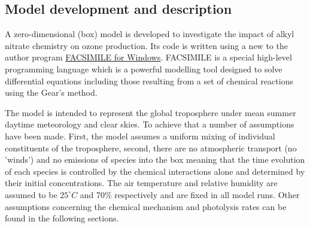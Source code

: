 \documentclass[11pt,a4paper]{article}
\begin{document}
\subsection{Model development and description} \label{sec:method_develop}
A zero-dimensional (box) model is developed to investigate the impact of alkyl nitrate chemistry on ozone production. Its code is written using a new to the author program \href{http://www.mcpa-software.com/}{FACSIMILE for Windows}. FACSIMILE is a special high-level programming language which is a powerful modelling tool designed to solve differential equations including those resulting from a set of chemical reactions using the Gear’s method.

The model is intended to represent the global troposphere under mean summer daytime meteorology and clear skies. To achieve that a number of assumptions have been made. First, the model assumes a uniform mixing of individual constituents of the troposphere, second, there are no atmospheric transport (no 'winds') and no emissions of species into the box meaning that the time evolution of each species is controlled by the chemical interactions alone and determined by their initial concentrations. The air temperature and relative humidity are assumed to be $25^{\circ}C$ and 70\% respectively and are fixed in all model runs. Other assumptions concerning the chemical mechanism and photolysis rates can be found in the following sections.
\end{document}
